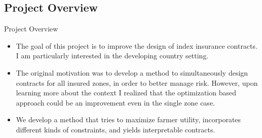 \documentclass{beamer}
\begin{document}
    
    

\subsection*{Project Overview}
\begin{frame}{Project Overview}
 \begin{itemize}
    \setlength\itemsep{1em}   
    \item The goal of this project is to improve the design of index insurance contracts. I am particularly interested in the developing country setting.  
    \item The original motivation was to develop a method to simultaneously design contracts for all insured zones, in order to better manage risk. However, upon learning more about the context I realized that the optimization based approach could be an improvement even in the single zone case. 
    \item We develop a method that tries to maximize farmer utility, incorporates different kinds of constraints, and yields interpretable contracts. 
 \end{itemize}
\end{frame}
\end{document}

